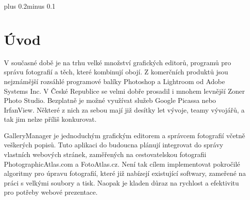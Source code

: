 \documentclass[11pt,twoside,a4paper]{book}
\begin{document}

\tableofcontents



\listoffigures



\listoftables



\mainbodystarts
\normalfont
{}\baselineskip plus 0.2\baselineskip minus 0.1\baselineskip



% 
% 


\chapter{Úvod}

\noindent
V současné době je na trhu velké množství grafických editorů, programů pro správu fotografií a těch, které kombinují obojí. Z komerčních produktů jsou nejznámější rozsáhlé programové balíky Photoshop a Lightroom od Adobe Systems Inc. V České Republice se velmi dobře prosadil i mnohem levnější Zoner Photo Studio. Bezplatně je možné využívat služeb Google Picassa nebo IrfanView. Některé z nich za sebou mají již desítky let vývoje, teamy vývojářů, a tak jim nelze příliš konkurovat.

\indent
GalleryManager je jednoduchým grafickým editorem a správcem fotografií včetně veškerých popisů. Tuto aplikaci do budoucna plánují integrovat do správy vlastních webových stránek, zaměřených na cestovatelskou fotografii PhotographicAtlas.com a FotoAtlas.cz. Není tak cílem implementovat pokročilé algoritmy pro úpravu fotografií, které již nabízejí existující softwary, zameřené na práci s velkými soubory a tisk. Naopak je kladen důraz na rychlost a efektivitu pro potřeby webové prezentace.
\end{document}
